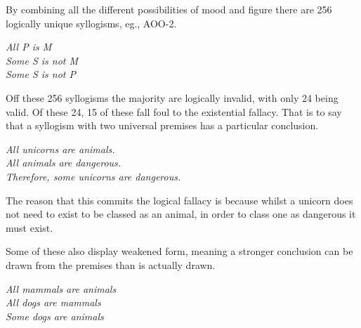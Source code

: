 \documentclass[12pt,a4paper]{report}
\newenvironment{tightcenter}{%
  \setlength\topsep{0pt}
  \setlength\parskip{0pt}
  \begin{center}
}{%
  \end{center}
}
\begin{document}
By combining all the different possibilities of mood and figure there are 256 logically unique syllogisms, eg., AOO-2. 
\bigbreak
\begin{tightcenter}
\textit{All P is M}\\ 
\textit{Some S is not M}\\
\textit{Some S is not P}\\
\end{tightcenter}
\bigbreak

Off these 256 syllogisms the majority are logically invalid, with only 24 being valid. Of these 24, 15 of these fall foul to the existential fallacy. That is to say that a syllogism with two universal premises has a particular conclusion. 
\bigbreak
\begin{tightcenter}
\textit{All unicorns are animals.}\\ 
\textit{All animals are dangerous.}\\
\textit{Therefore, some unicorns are dangerous.}\\
\end{tightcenter}
\bigbreak

The reason that this commits the logical fallacy is because whilst a unicorn does not need to exist to be classed as an animal, in order to class one as dangerous it must exist.

Some of these also display weakened form, meaning a stronger conclusion can be drawn from the premises than is actually drawn.



\bigbreak
\begin{tightcenter}
\textit{All mammals are animals}\\ 
\textit{All dogs are mammals}\\
\textit{Some dogs are animals }\\
\end{tightcenter}
\bigbreak



 
\end{document}
